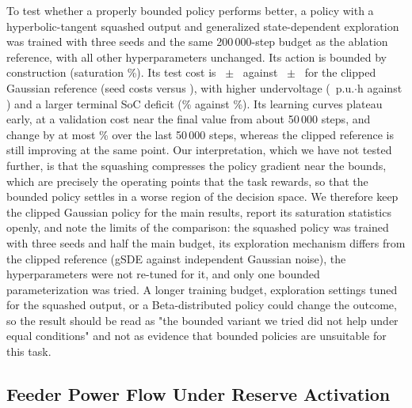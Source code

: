 To test whether a properly bounded policy performs better, a policy
with a hyperbolic-tangent squashed output and generalized
state-dependent exploration \cite{Raffin2022} was trained with three
seeds and the same 200\,000-step budget as the ablation reference, with
all other hyperparameters unchanged. Its action is bounded by
construction (saturation \ClipSquashAll\%). Its test cost is
\AblSquashCost~$\pm$~\AblSquashCostSd{} against \AblRefCost~$\pm$~\AblRefCostSd{}
for the clipped Gaussian reference (seed costs \AblSquashSeedCosts{}
versus \AblRefSeedCosts), with higher undervoltage
(\AblSquashUvPuH~p.u.$\cdot$h against \AblRefUvPuH) and a larger
terminal SoC deficit (\AblSquashSocDefPct\% against \AblRefSocDefPct\%).
Its learning curves plateau early, at a validation cost near the
final value from about 50\,000 steps, and change by at most
\AblSquashConvMax\% over the last 50\,000 steps, whereas the clipped
reference is still improving at the same point. Our interpretation,
which we have not tested further, is that the squashing compresses
the policy gradient near the bounds, which are precisely the
operating points that the task rewards, so that the bounded policy
settles in a worse region of the decision space. We therefore keep
the clipped Gaussian policy for the main results, report its saturation
statistics openly, and note the limits of the comparison: the squashed
policy was trained with three seeds and half the main budget, its
exploration mechanism differs from the clipped reference (gSDE against
independent Gaussian noise), the hyperparameters were not re-tuned for
it, and only one bounded parameterization was tried. A longer
training budget, exploration settings tuned for the squashed output,
or a Beta-distributed policy could change the outcome, so the result
should be read as "the bounded variant we tried did not help under
equal conditions" and not as evidence that bounded policies are
unsuitable for this task.



\subsection{Feeder Power Flow Under Reserve Activation}
\label{sec:activation}

